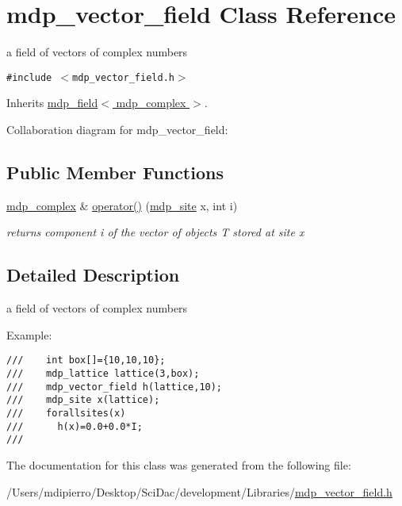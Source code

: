 \hypertarget{classmdp__vector__field}{
\section{mdp\_\-vector\_\-field Class Reference}
\label{classmdp__vector__field}
}
a field of vectors of complex numbers  


{\tt \#include $<$mdp\_\-vector\_\-field.h$>$}

Inherits \hyperlink{classmdp__field}{mdp\_\-field$<$ mdp\_\-complex $>$}.

Collaboration diagram for mdp\_\-vector\_\-field:\subsection*{Public Member Functions}
\begin{CompactItemize}
\item 
\hypertarget{classmdp__vector__field_a50ba6cb67e5978d0e362b70ea703164}{
\hyperlink{classmdp__complex}{mdp\_\-complex} \& \hyperlink{classmdp__vector__field_a50ba6cb67e5978d0e362b70ea703164}{operator()} (\hyperlink{classmdp__site}{mdp\_\-site} x, int i)}
\label{classmdp__vector__field_a50ba6cb67e5978d0e362b70ea703164}

\begin{CompactList}\small\item\em returns component i of the vector of objects T stored at site x \item\end{CompactList}\end{CompactItemize}


\subsection{Detailed Description}
a field of vectors of complex numbers 

Example: 

\footnotesize\begin{verbatim}
///    int box[]={10,10,10};
///    mdp_lattice lattice(3,box);
///    mdp_vector_field h(lattice,10);
///    mdp_site x(lattice);
///    forallsites(x)
///      h(x)=0.0+0.0*I;
/// \end{verbatim}
\normalsize
 

The documentation for this class was generated from the following file:\begin{CompactItemize}
\item 
/Users/mdipierro/Desktop/SciDac/development/Libraries/\hyperlink{mdp__vector__field_8h}{mdp\_\-vector\_\-field.h}\end{CompactItemize}
